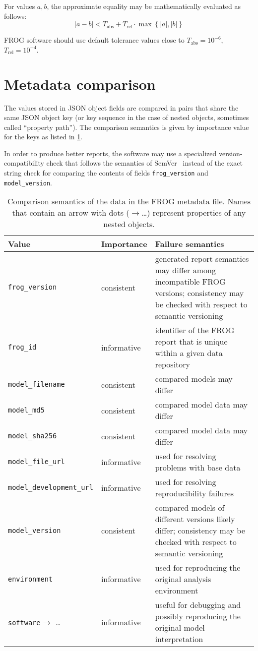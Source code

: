 For values $a, b$, the approximate equality may be mathematically evaluated as follows:
$$|a-b|<T_{\text{abs}} + T_{\text{rel}}\cdot \max\left\{|a|, |b|\right\}$$

FROG software should use default tolerance values close to $T_\text{abs}=10^{-6}$, $T_\text{rel}=10^{-4}$.

\section{Metadata comparison}

The values stored in JSON object fields are compared in pairs that share the same JSON object key (or key sequence in the case of nested objects, sometimes called ``property path'').
The comparison semantics is given by importance value for the keys as listed in \cref{tab:cmpmeta}.

In order to produce better reports, the software may use a specialized version-compatibility check that follows the semantics of SemVer~\cite{semver} instead of the exact string check for comparing the contents of fields \verb|frog_version| and \verb|model_version|.

\begin{table}\tablefont
\begin{tabular}{llp{30em}}
\toprule
Value & Importance & Failure semantics \\
\midrule
\verb|frog_version|
 & consistent
 & generated report semantics may differ among incompatible FROG versions; consistency may be checked with respect to semantic versioning~\cite{semver}
 \\
\verb|frog_id|
 & informative
 & identifier of the FROG report that is unique within a given data repository
 \\
\verb|model_filename|
 & consistent
 & compared models may differ
 \\
\verb|model_md5|
 & consistent
 & compared model data may differ
 \\
\verb|model_sha256|
 & consistent
 & compared model data may differ
 \\
\verb|model_file_url|
 & informative
 & used for resolving problems with base data
 \\
\verb|model_development_url|
 & informative
 & used for resolving reproducibility failures
 \\
\verb|model_version|
 & consistent
 & compared models of different versions likely differ; consistency may be checked with respect to semantic versioning~\cite{semver}
 \\
\verb|environment|
 & informative
 & used for reproducing the original analysis environment
 \\
\verb|software|$\to$ \dots
 & informative
 & useful for debugging and possibly reproducing the original model interpretation
 \\
\bottomrule
\end{tabular}
\caption[Comparison semantics of the FROG metadata file.]{Comparison semantics of the data in the FROG metadata file. Names that contain an arrow with dots ($\to$\dots) represent properties of any nested objects.}
\label{tab:cmpmeta}
\end{table}

